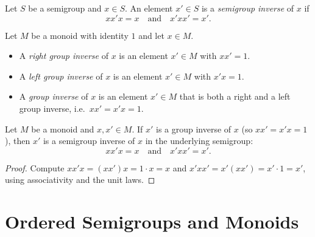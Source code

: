 \begin{definition}
\label{def:semigroup-inverse}
Let \(S\) be a semigroup and \(x\in S\). An element \(x'\in S\) is a \emph{semigroup inverse} of \(x\) if
\[
x x' x = x \quad\text{and}\quad x' x x' = x'.
\]
\end{definition}

\begin{definition}
\label{def:group-inverse}
Let \(M\) be a monoid with identity \(1\) and let \(x\in M\).
\begin{itemize}
  \item A \emph{right group inverse} of \(x\) is an element \(x'\in M\) with \(x x' = 1\).
  \item A \emph{left group inverse} of \(x\) is an element \(x'\in M\) with \(x' x = 1\).
  \item A \emph{group inverse} of \(x\) is an element \(x'\in M\) that is both a right and a left group inverse, i.e.\ \(x x' = x' x = 1\).
\end{itemize}
\end{definition}

\begin{lemma}
\label{lem:group-inverse-implies-semigroup-inverse}
Let \(M\) be a monoid and \(x,x'\in M\). If \(x'\) is a group inverse of \(x\) (so \(x x' = x' x = 1\)), then \(x'\) is a semigroup inverse of \(x\) in the underlying semigroup:
\[
x x' x = x \quad\text{and}\quad x' x x' = x'.
\]
\end{lemma}
\begin{proof}
Compute \(x x' x = (x x') x = 1\cdot x = x\) and \(x' x x' = x' (x x') = x' \cdot 1 = x'\), using associativity and the unit laws.
\end{proof}
\chapter {Ordered Semigroups and Monoids}

